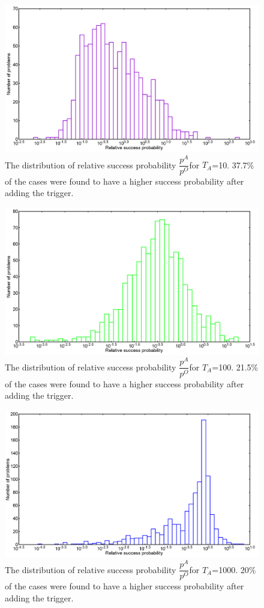 \documentclass[12]{article}
\begin{document}
\begin{figure}[H]
\centering 
\includegraphics[scale=0.3]{A_T10_g1.png}
\caption{The distribution of relative success probability $\dfrac{p^A}{p^O}$for $T_A$=10. 37.7\% of the cases were found to have a higher success probability after adding the trigger.}
\label{fig:a18}
\end{figure}
\begin{figure}[H]
\centering 
\includegraphics[scale=0.3]{A_T100_g1.png}
\caption{The distribution of relative success probability $\dfrac{p^A}{p^O}$for $T_A$=100. 21.5\% of the cases were found to have a higher success probability after adding the trigger. }
\label{fig:a19}
\end{figure}
\begin{figure}[H]
\centering 
\includegraphics[scale=0.3]{A_T1000_g1.png}
\caption{The distribution of relative success probability $\dfrac{p^A}{p^O}$for $T_A$=1000. 20\% of the cases were found to have a higher success probability after adding the trigger.}
\label{fig:a20}
\end{figure}
\end{document}
